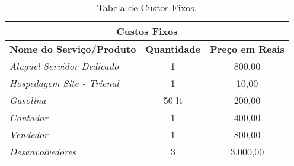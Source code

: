 		\begin{table}[H]
			\centering
			\caption{Tabela de Custos Fixos.}
			
			
				\begin{tabularx}{\linewidth}{|X|c|c|}
					\toprule
					\multicolumn{3}{c}{\cellcolor{gray!50}\textbf{Custos Fixos}} \\
					\midrule
					\textbf{Nome do Serviço/Produto} & \textbf{Quantidade} & \textbf{Preço em Reais}\\
					\midrule
					\textit{Aluguel Servidor Dedicado} 	& 1 	& 800,00 \\
					\textit{Hospedagem Site - Trienal} 	& 1 	& 10,00 \\
					\textit{Gasolina} 					& 50 lt & 200,00 \\
					\textit{Contador} 					& 1 	& 400,00 \\
					\textit{Vendedor} 					& 1 	& 800,00 \\
					\textit{Desenvolvedores} 			& 3 	& 3.000,00 \\
					\bottomrule
				\end{tabularx}
			
			\label{tab:custosFixos}
		\end{table}